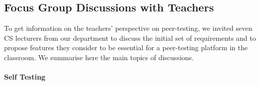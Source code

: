 \documentclass[sigplan,10pt,review]{acmart}\settopmatter{printfolios=true}
\begin{document}


\subsection{Focus Group Discussions with Teachers}
\label{sec:teacher-requirements}

To get information on the teachers' perspective on peer-testing, we
invited seven \ac{CS} lecturers from our department to discuss the
initial set of requirements and to propose features they consider to be
essential for a peer-testing platform in the classroom. We summarise
here the main topics of discussions.


\paragraph{Self Testing}
\end{document}

